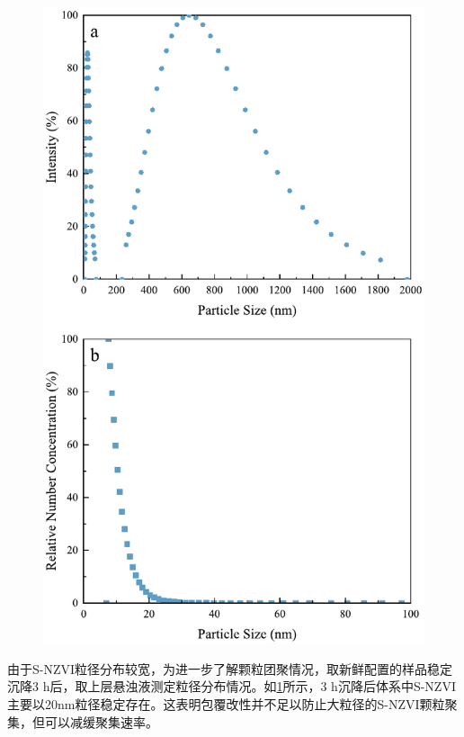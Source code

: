 \begin{figure}
    \centering
    \includegraphics[scale=0.65]{figs/Graph2.pdf}
    \label{graph2}
\end{figure}

由于S-NZVI粒径分布较宽，为进一步了解颗粒团聚情况，取新鲜配置的样品稳定沉降3 h后，取上层悬浊液测定粒径分布情况。如\cref{graph2}所示，3 h沉降后体系中S-NZVI主要以20nm粒径稳定存在。这表明包覆改性并不足以防止大粒径的S-NZVI颗粒聚集，但可以减缓聚集速率。

